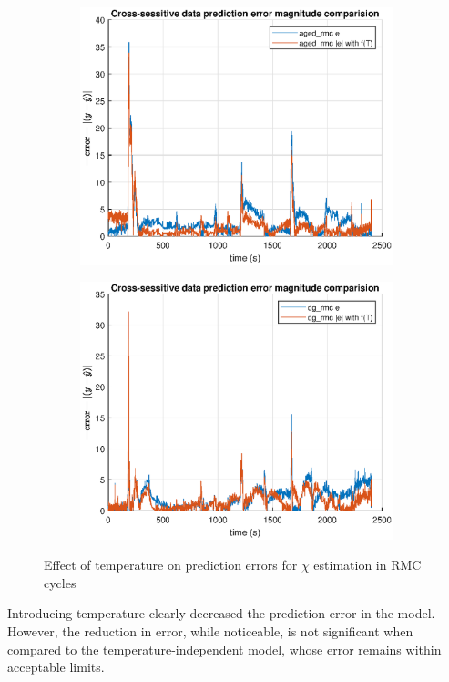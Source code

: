 \begin{figure}[H]
    \begin{minipage}{0.49\textwidth}
        \begin{figure}[H]
            \includegraphics[width=\textwidth]{./figs/chi_est/aged_error_comp.eps}
        \end{figure}
    \end{minipage}
    \begin{minipage}{0.49\textwidth}
        \begin{figure}[H]
            \includegraphics[width=\textwidth]{./figs/chi_est/dg_error_comp.eps}
        \end{figure}
    \end{minipage}
        \caption{Effect of temperature on prediction errors for $\chi$ estimation in RMC cycles}
\end{figure}


Introducing temperature clearly decreased the prediction error in the model. However, the reduction in error, while noticeable, is not significant when compared to the temperature-independent model, whose error remains within acceptable limits.

